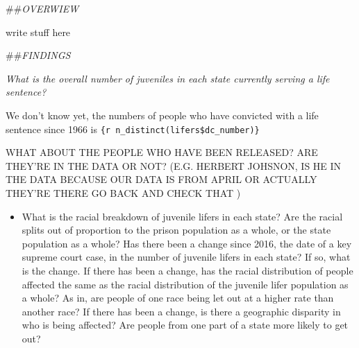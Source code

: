 \documentclass[]{article}
\providecommand{\tightlist}{%
  \setlength{\itemsep}{0pt}\setlength{\parskip}{0pt}}
\begin{document}
\#\#\emph{OVERWIEW}

write stuff here

\#\#\emph{FINDINGS}

\emph{What is the overall number of juveniles in each state currently
serving a life sentence?}

We don't know yet, the numbers of people who have convicted with a life
sentence since 1966 is \texttt{\{r\ n\_distinct(lifers\$dc\_number)\}}

WHAT ABOUT THE PEOPLE WHO HAVE BEEN RELEASED? ARE THEY'RE IN THE DATA OR
NOT? (E.G. HERBERT JOHSNON, IS HE IN THE DATA BECAUSE OUR DATA IS FROM
APRIL OR ACTUALLY THEY'RE THERE GO BACK AND CHECK THAT )

\begin{itemize}
\tightlist
\item
  What is the racial breakdown of juvenile lifers in each state? Are the
  racial splits out of proportion to the prison population as a whole,
  or the state population as a whole? Has there been a change since
  2016, the date of a key supreme court case, in the number of juvenile
  lifers in each state? If so, what is the change. If there has been a
  change, has the racial distribution of people affected the same as the
  racial distribution of the juvenile lifer population as a whole? As
  in, are people of one race being let out at a higher rate than another
  race? If there has been a change, is there a geographic disparity in
  who is being affected? Are people from one part of a state more likely
  to get out?
\end{itemize}
\end{document}
